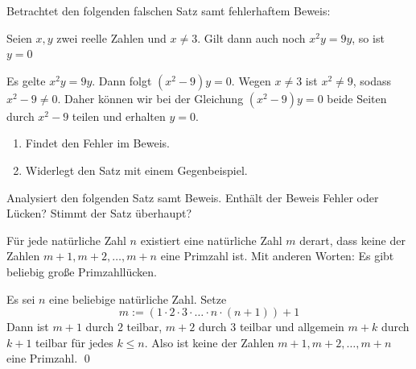 \begin{aufg}[Fehlersuche I]
    Betrachtet den folgenden falschen Satz samt fehlerhaftem Beweis:
    \begin{satz}
        Seien $x,y$ zwei reelle Zahlen und $x\neq 3$. Gilt dann auch noch $x^2y=9y$, so ist $y=0$
    \end{satz}
    \begin{bew}
        Es gelte $x^2y=9y$. Dann folgt $(x^2-9)y=0$. Wegen $x\neq 3$ ist $x^2\neq 9$, sodass $x^2-9\neq 0$. Daher können wir bei der Gleichung $(x^2-9)y=0$ beide Seiten durch $x^2-9$ teilen und erhalten $y=0$.
    \end{bew}
    \begin{enumerate}
        \item Findet den Fehler im Beweis.
        \item Widerlegt den Satz mit einem Gegenbeispiel.
    \end{enumerate}
\end{aufg}


\begin{aufg}[Fehlersuche II]
    Analysiert den folgenden Satz samt Beweis. Enthält der Beweis Fehler oder Lücken? Stimmt der Satz überhaupt?
    \begin{satz}
        Für jede natürliche Zahl $n$ existiert eine natürliche Zahl $m$ derart, dass keine der Zahlen $m+1,m+2,\dots , m+n$ eine Primzahl ist. Mit anderen Worten: Es gibt beliebig große Primzahllücken.
    \end{satz}
    \begin{bew}
        Es sei $n$ eine beliebige natürliche Zahl. Setze 
            \[ m:= (1 \cdot 2 \cdot 3 \cdot \ldots \cdot n \cdot(n+1)) +1 \]
        Dann ist $m+1$ durch $2$ teilbar, $m+2$ durch $3$ teilbar und allgemein $m+k$ durch $k+1$ teilbar für jedes $k\le n$. Also ist keine der Zahlen $m+1,m+2,\dots , m+n$ eine Primzahl. \qed
    \end{bew}
\end{aufg}


